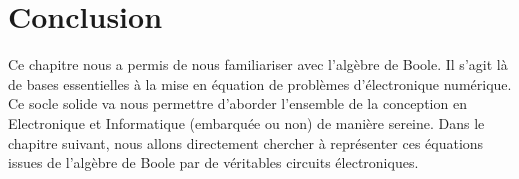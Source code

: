 \section{Conclusion}
Ce chapitre nous a permis de nous familiariser avec l'algèbre de Boole. Il s'agit là de bases essentielles
à la mise en équation de problèmes d'électronique numérique. Ce socle solide va nous permettre d'aborder l'ensemble de la conception en Electronique
et Informatique (embarquée ou non) de manière sereine. Dans le chapitre suivant, nous allons directement chercher à représenter ces équations issues
de l'algèbre de Boole par de véritables circuits électroniques.
